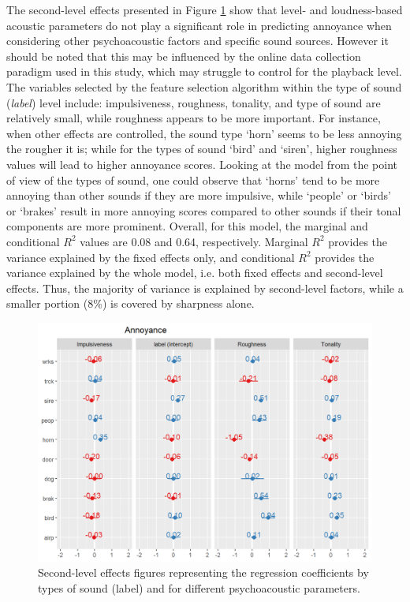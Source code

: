 The second-level effects presented in Figure \ref{fig:annoyance-effects} show that level- and loudness-based acoustic parameters do not play a significant role in predicting annoyance when considering other psychoacoustic factors and specific sound sources. However it should be noted that this may be influenced by the online data collection paradigm used in this study, which may struggle to control for the playback level. The variables selected by the feature selection algorithm within the type of sound (\emph{label}) level include: impulsiveness, roughness, tonality, and type of sound are relatively small, while roughness appears to be more important. For instance, when other effects are controlled, the sound type `horn' seems to be less annoying the rougher it is; while for the types of sound `bird' and `siren', higher roughness values will lead to higher annoyance scores. Looking at the model from the point of view of the types of sound, one could observe that `horns' tend to be more annoying than other sounds if they are more impulsive, while `people' or `birds' or `brakes' result in more annoying scores compared to other sounds if their tonal components are more prominent. Overall, for this model, the marginal and conditional $R^2$ values are 0.08 and 0.64, respectively. Marginal $R^2$ provides the variance explained by the fixed effects only, and conditional $R^2$ provides the variance explained by the whole model, i.e. both fixed effects and second-level effects. Thus, the majority of variance is explained by second-level factors, while a smaller portion (8\%) is covered by sharpness alone.

\begin{figure}[h]
  \centering
  \includegraphics[width=\textwidth]{Figures/OrganMLMAnnoyanceRandom.png}
  \caption{Second-level effects figures representing the regression coefficients by types of sound (label) and for different psychoacoustic parameters. \label{fig:annoyance-effects}
}
\end{figure}

